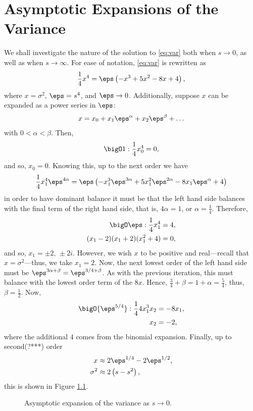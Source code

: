 
\chapter{Asymptotic Expansions of the Variance}
\label{chap:asymp}
We shall investigate the nature of the solution to \eqref{eq:var} both when $s \rightarrow 0$, as well as when $s \rightarrow \infty$. For ease of notation, \eqref{eq:var} is rewritten as
\begin{align*}
\frac{1}{4} x^4 = \eps \left( -x^3 + 5x^2 - 8x + 4 \right),
\end{align*}
where $x = \sigma^2$, $\eps = s^4$, and $\eps \rightarrow 0$. Additionally, suppose $x$ can be expanded as a power series in $\eps$:
\begin{align*}
x = x_0 + x_1 \eps^\alpha + x_2 \eps^\beta + \dots
\end{align*}
with $0 < \alpha < \beta$. Then,
\begin{align*}
\bigO1 : \frac{1}{4} x_0^4 = 0,
\end{align*}
and so, $x_0 = 0$. Knowing this, up to the next order we have
\begin{align*}
\frac{1}{4} x_1^4 \eps^{4\alpha} = \eps \left( -x_1^3 \eps^{3\alpha} + 5x_1^2 \eps^{2\alpha} - 8x_1 \eps^\alpha + 4 \right)
\end{align*}
in order to have dominant balance it must be that the left hand side balances with the final term of the right hand side, that is, $4\alpha = 1$, or $\alpha = \frac{1}{4}$. Therefore,
\begin{align*}
\bigO\eps : \frac{1}{4} x_1^4 &= 4, \\
(x_1 - 2)(x_1 + 2)(x_1^2 + 4) &= 0,
\end{align*}
and so, $x_1 = \pm 2, \, \pm 2 i$. However, we wish $x$ to be positive and real---recall that $x = \sigma^2$---thus, we take $x_1 = 2$. Now, the next lowest order of the left hand side must be $\eps^{3\alpha + \beta} = \eps^{3/4 + \beta}$. As with the previous iteration, this must balance with the lowest order term of the $8x$. Hence, $\frac{3}{4} + \beta = 1 + \alpha = \frac{5}{4}$, thus, $\beta = \frac{1}{2}$. Now,
\begin{align*}
\bigO{\eps^{5/4}}: \frac{1}{4} 4 x_1^3 x_2 &= -8x_1, \\
x_2 &= -2,
\end{align*}
where the additional $4$ comes from the binomial expansion. Finally, up to second(?***) order
\begin{align*}
x &\approx 2 \eps^{1/4} - 2 \eps^{1/2}, \\
\sigma^2 &\approx 2 \left( s - s^2 \right),
\end{align*}
this is shown in Figure \ref{fig:lims0}.
\begin{figure}[tbp]

\caption{Asymptotic expansion of the variance as $s \rightarrow 0$.}
\label{fig:lims0}
\end{figure}

